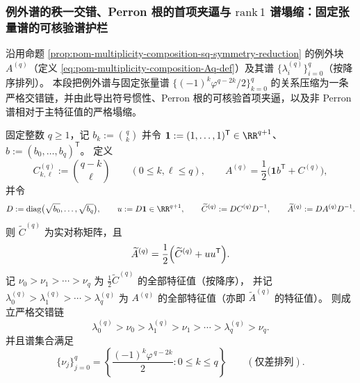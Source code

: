 \subsubsection{例外谱的秩一交错、Perron 根的首项夹逼与 \texorpdfstring{$\mathrm{rank}\,1$}{rank-1} 谱塌缩：固定张量谱的可核验谱护栏}
沿用命题 \ref{prop:pom-multiplicity-composition-sq-symmetry-reduction} 的例外块 \(A^{(q)}\)（定义 \eqref{eq:pom-multiplicity-composition-Aq-def}）及其谱
\(\{\lambda_i^{(q)}\}_{i=0}^{q}\)（按降序排列）。
本段把例外谱与固定张量谱 \(\{(-1)^k\varphi^{q-2k}/2\}_{k=0}^{q}\) 的关系压缩为一条严格交错链，并由此导出符号惯性、Perron 根的可核验首项夹逼，以及非 Perron 谱相对于主特征值的严格塌缩。

\begin{theorem}\label{thm:xi-replica-softcore-exceptional-interlacing}
固定整数 \(q\ge 1\)，记 \(b_k:=\binom{q}{k}\) 并令 \(\mathbf{1}:=(1,\dots,1)^{\mathsf T}\in\RR^{q+1}\)、\(b:=(b_0,\dots,b_q)^{\mathsf T}\)。
定义
\[
C^{(q)}_{k,\ell}:=\binom{q-k}{\ell}\qquad(0\le k,\ell\le q),
\qquad
A^{(q)}=\frac12\bigl(\mathbf{1}b^{\mathsf T}+C^{(q)}\bigr),
\]
并令
\[
D:=\mathrm{diag}\bigl(\sqrt{b_0},\dots,\sqrt{b_q}\bigr),\qquad
u:=D\mathbf{1}\in\RR^{q+1},
\qquad
\widetilde C^{(q)}:=D C^{(q)}D^{-1},\qquad
\widetilde A^{(q)}:=D A^{(q)}D^{-1}.
\]
则 \(\widetilde C^{(q)}\) 为实对称矩阵，且
\[
\widetilde A^{(q)}=\frac12\Bigl(\widetilde C^{(q)}+uu^{\mathsf T}\Bigr).
\]
记 \(\nu_0>\nu_1>\cdots>\nu_q\) 为 \(\frac12\widetilde C^{(q)}\) 的全部特征值（按降序），
并记 \(\lambda_0^{(q)}>\lambda_1^{(q)}>\cdots>\lambda_q^{(q)}\) 为 \(A^{(q)}\) 的全部特征值（亦即 \(\widetilde A^{(q)}\) 的特征值）。
则成立严格交错链
\[
\lambda_0^{(q)}>\nu_0>\lambda_1^{(q)}>\nu_1>\cdots>\lambda_q^{(q)}>\nu_q.
\]
并且谱集合满足
\[
\{\nu_j\}_{j=0}^{q}=\left\{\frac{(-1)^k\varphi^{\,q-2k}}{2}:0\le k\le q\right\}
\qquad(\text{仅差排列}).
\]
\end{theorem}
